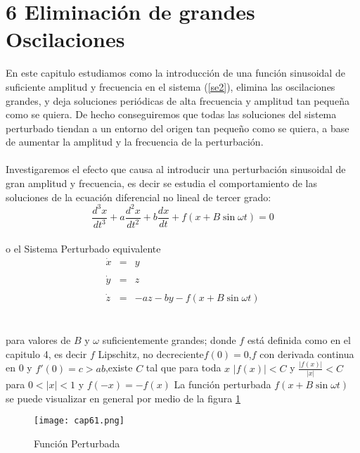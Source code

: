 \documentclass[letter]{article}
\begin{document}
\section{6 Eliminaci{\'o}n de grandes Oscilaciones}
 
\color{black} En este capitulo estudiamos como la introducci{\'o}n de
una funci{\'o}n sinusoidal de suficiente amplitud y frecuencia en el
sistema (\ref{se2}), elimina las oscilaciones grandes, y deja
soluciones peri{\'o}dicas de alta frecuencia y amplitud tan peque{\~n}a
como se quiera. De hecho conseguiremos que todas las soluciones
del sistema perturbado tiendan a un entorno del origen tan peque{\~n}o
como se quiera, a base de aumentar la amplitud y la frecuencia de
la perturbaci{\'o}n.
\\
\\
Investigaremos el efecto que causa al introducir una perturbaci{\'o}n
sinusoidal de gran amplitud y frecuencia, es decir se estudia el
comportamiento de las soluciones de la ecuaci{\'o}n diferencial no
lineal de tercer grado:
\\
\begin{equation}
\displaystyle{\frac{d^3
x}{dt^3}+a\frac{d^2x}{dt^2}+b\frac{dx}{dt}+f(x+B\sin\omega t)}=0
\end{equation}
\\
o el Sistema  Perturbado equivalente
\\
\begin{equation}\label{sao8}
\begin{array}{lcl}
\dot{x}&=& y\\&&\\ \dot{y}&=& z\\&&\\\dot{z}&=&
-az-by-f(x+B\sin\omega t)
\end{array}
\end{equation}
\\
\\
para valores de $B$ y $\omega $ suficientemente grandes; donde $f$
est{\'a}  definida como en el capi\-tulo 4, es decir $f$ Lipschitz, no
decreciente\quad $f(0)=0$,\quad $f$ con derivada continua en 0 y
$f'(0)=c>ab$,\quad existe $C$ tal que para toda $x$\quad
$|f(x)|<C$ y $\displaystyle{\frac{|f(x)|}{|x|}}<C$ para $0<|x|<1$
y $f(-x)=-f(x)$
\newpage
La funci{\'o}n perturbada $f(x+B\sin\omega t)$ se puede visualizar en
general por medio de la figura \ref{afig61}
\begin{figure}[h]
\centering
\texttt{[image: cap61.png]}
\caption{Funci{\'o}n Perturbada}\label{afig61}
\end{figure}
\end{document}
